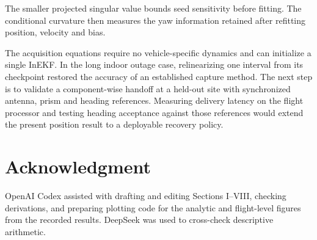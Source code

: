 \documentclass{IEEEtaes}
\begin{document}
The smaller projected singular value bounds seed sensitivity before fitting. The conditional curvature then measures the yaw information retained after refitting position, velocity and bias.

The acquisition equations require no vehicle-specific dynamics and can initialize a single InEKF. In the long indoor outage case, relinearizing one interval from its checkpoint restored the accuracy of an established capture method. The next step is to validate a component-wise handoff at a held-out site with synchronized antenna, prism and heading references. Measuring delivery latency on the flight processor and testing heading acceptance against those references would extend the present position result to a deployable recovery policy.

\section*{Acknowledgment}
OpenAI Codex assisted with drafting and editing Sections I--VIII, checking derivations, and preparing plotting code for the analytic and flight-level figures from the recorded results. DeepSeek was used to cross-check descriptive arithmetic.



\end{document}
